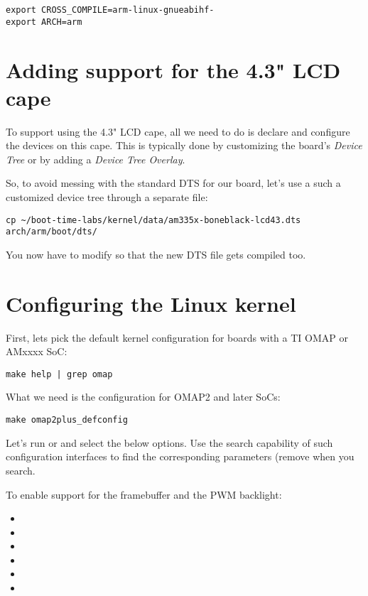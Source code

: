 \begin{verbatim}
export CROSS_COMPILE=arm-linux-gnueabihf-
export ARCH=arm
\end{verbatim}

\section{Adding support for the 4.3" LCD cape}

To support using the 4.3" LCD cape, all we need to do is declare and
configure the devices on this cape. This is typically done by
customizing the board's {\em Device Tree} or by adding a {\em Device
Tree Overlay}.

So, to avoid messing with the standard DTS for our board, let's use a
such a customized device tree through a separate file:

\begin{verbatim}
cp ~/boot-time-labs/kernel/data/am335x-boneblack-lcd43.dts arch/arm/boot/dts/
\end{verbatim}

You now have to modify  so that
the new DTS file gets compiled too.

\section{Configuring the Linux kernel}

First, lets pick the default kernel configuration for boards with a TI
OMAP or AMxxxx SoC:

\begin{verbatim}
make help | grep omap
\end{verbatim}

What we need is the configuration for OMAP2 and later SoCs:
\begin{verbatim}
make omap2plus_defconfig
\end{verbatim}

Let's run  or  and select the
below options. Use the search capability of such configuration
interfaces to find the corresponding parameters (remove 
when you search.

To enable support for the framebuffer and the PWM backlight:
\begin{itemize}
\item {}
\item {}
\item {}
\item {}
\item {}
\item {}
\end{itemize}

